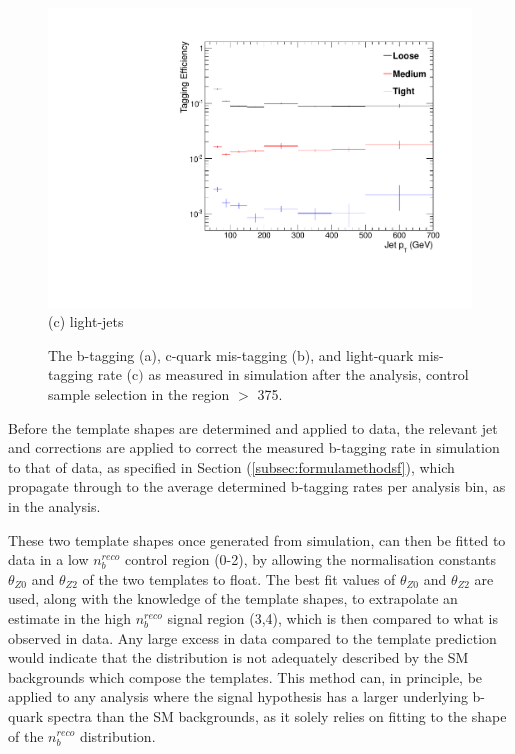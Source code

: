 \begin{figure}[ht]
\begin{minipage}[b]{0.48\linewidth}
\includegraphics[width = 1.0\linewidth]{plots/lighjet_PtDistribution_Htbin_Template_375.pdf}
\centering (c) light-jets
\end{minipage}
\caption[The b-tagging (a), c-quark mis-tagging (b), and light-quark mis-tagging rate (c$)$ as measured in simulation after the \alphat analysis, \mupjets control sample selection in the region \theht $>$ 375.]{The b-tagging (a), c-quark mis-tagging (b), and light-quark mis-tagging rate (c$)$ as measured in simulation after the \alphat analysis, \mupjets control sample selection in the region \theht $>$ 375.}
\label{fig:templatetaggingefficiencies}
\end{figure}

Before the template shapes are determined and applied to data, the relevant jet \pt and \eta corrections are applied to correct the measured b-tagging rate in simulation to that of data, as specified in Section (\ref{subsec:formulamethodsf}), which propagate through to the average determined b-tagging rates per analysis \theht bin, as in the \alphat analysis.  

These two template shapes once generated from simulation, can then be fitted to data in a low $n_{b}^{reco}$ control region (0-2), by allowing the normalisation constants $\theta_{Z0}$ and $\theta_{Z2}$ of the two templates to float. The best fit values of $\theta_{Z0}$ and $\theta_{Z2}$ are used, along with the knowledge of the template shapes, to extrapolate an estimate in the high $n_{b}^{reco}$ signal region (3,4), which is then compared to what is observed in data. Any large excess in data compared to the template prediction would indicate that the \nbreco distribution is not adequately described by the \ac{SM} backgrounds which compose the templates. This method can, in principle, be applied to any analysis where the signal hypothesis has a larger underlying b-quark spectra than the \ac{SM} backgrounds, as it solely relies on fitting to the shape of the $n_{b}^{reco}$ distribution. 


